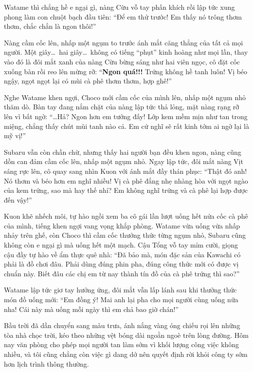 \documentclass[../main.tex]{subfiles}
\begin{document}
Watame thì chẳng hề e ngại gì, nàng Cừu vỗ tay phấn khích rồi lập tức xung phong làm con chuột bạch đầu tiên: ``Để em thử trước! Em thấy nó trông thơm thơm, chắc chắn là ngon thôi!''

Nàng cầm cốc lên, nhấp một ngụm to trước ánh mắt căng thẳng của tất cả mọi người. Một giây\dots\ hai giây\dots\ không có tiếng ``phụt'' kinh hoàng như mọi lần, thay vào đó là đôi mắt xanh của nàng Cừu bừng sáng như hai viên ngọc, cô đặt cốc xuống bàn rồi reo lên mừng rỡ: ``\textbf{Ngon quá!!!} Trứng không hề tanh luôn! Vị béo ngậy, ngọt ngọt lại có mùi cà phê thơm thơm, hợp ghê!''

Nghe Watame khen ngợi, Choco mới cầm cốc của mình lên, nhấp một ngụm nhỏ thăm dò. Bàn tay đang nắm chặt của nàng lập tức thả lỏng, mặt nàng rạng rỡ lên vì bất ngờ: ``\dots Hả? Ngon hơn em tưởng đấy! Lớp kem mềm mịn như tan trong miệng, chẳng thấy chút mùi tanh nào cả. Em cứ nghĩ sẽ rất kinh tởm ai ngờ lại là mỹ vị!''

Subaru vẫn còn chần chừ, nhưng thấy hai người bạn đều khen ngon, nàng cũng dồn can đảm cầm cốc lên, nhấp một ngụm nhỏ. Ngay lập tức, đôi mắt nàng Vịt sáng rực lên, cô quay sang nhìn Kuon với ánh mắt đầy thán phục: ``Thật đó anh! Nó thơm và béo hơn em nghĩ nhiều! Vị cà phê đắng nhẹ nhàng hòa với ngọt ngào của kem trứng, sao mà hay thế nhỉ? Em không nghĩ trứng và cà phê lại hợp được đến vậy!''

Kuon khẽ nhếch môi, tự hào ngồi xem ba cô gái lần lượt uống hết nửa cốc cà phê của mình, tiếng khen ngợi vang vọng khắp phòng. Watame vừa uống vừa nhấp nhảy trên ghế, còn Choco thì cầm cốc thưởng thức từng ngụm nhỏ, Subaru cũng không còn e ngại gì mà uống hết một mạch. Cậu Tổng vỗ tay mỉm cười, giọng cậu đầy tự hào về ẩm thực quê nhà: ``Đã bảo mà, món đặc sản của Kawachi có phải là đồ chơi đâu. Phải dùng đúng phin pha, đúng công thức mới có được vị chuẩn này. Biết đâu các chị em từ nay thành tín đồ của cà phê trứng thì sao?''

Watame lập tức giơ tay hưởng ứng, đôi mắt vẫn lấp lánh sau khi thưởng thức món đồ uống mới: ``Em đồng ý! Mai anh lại pha cho mọi người cùng uống nữa nha! Cái này mà uống mỗi ngày thì em chả bao giờ chán!''

\il


Bầu trời đã dần chuyển sang màu trưa, ánh nắng vàng óng chiếu rọi lên những tòa nhà chọc trời, kéo theo những vệt bóng dài ngoằn ngoè trên lòng đường. Hôm nay văn phòng cho phép mọi người tan làm sớm vì khối lượng công việc không nhiều, và tôi cũng chẳng còn việc gì dang dở nên quyết định rời khỏi công ty sớm hơn lịch trình thông thường.
\end{document}
